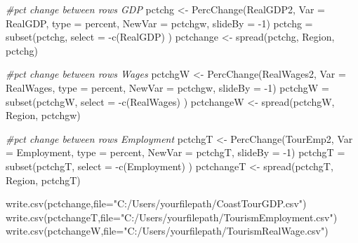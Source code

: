 \documentclass[
]{book}
\newenvironment{Shaded}{\begin{snugshade}}{\end{snugshade}}
\newcommand{\AttributeTok}[1]{\textcolor[rgb]{0.77,0.63,0.00}{#1}}
\newcommand{\CommentTok}[1]{\textcolor[rgb]{0.56,0.35,0.01}{\textit{#1}}}
\newcommand{\DecValTok}[1]{\textcolor[rgb]{0.00,0.00,0.81}{#1}}
\newcommand{\FunctionTok}[1]{\textcolor[rgb]{0.00,0.00,0.00}{#1}}
\newcommand{\NormalTok}[1]{#1}
\newcommand{\OtherTok}[1]{\textcolor[rgb]{0.56,0.35,0.01}{#1}}
\newcommand{\SpecialCharTok}[1]{\textcolor[rgb]{0.00,0.00,0.00}{#1}}
\newcommand{\StringTok}[1]{\textcolor[rgb]{0.31,0.60,0.02}{#1}}
\begin{document}
\begin{Shaded}
\begin{Highlighting}[]
\CommentTok{\#pct change between rows GDP}
\NormalTok{pctchg }\OtherTok{\textless{}{-}} \FunctionTok{PercChange}\NormalTok{(RealGDP2, }\AttributeTok{Var =} \StringTok{\textquotesingle{}RealGDP\textquotesingle{}}\NormalTok{,}
                     \AttributeTok{type =} \StringTok{\textquotesingle{}percent\textquotesingle{}}\NormalTok{,}
                     \AttributeTok{NewVar =} \StringTok{\textquotesingle{}pctchgw\textquotesingle{}}\NormalTok{,}
                     \AttributeTok{slideBy =} \SpecialCharTok{{-}}\DecValTok{1}\NormalTok{)}
\NormalTok{pctchg }\OtherTok{=} \FunctionTok{subset}\NormalTok{(pctchg, }\AttributeTok{select =} \SpecialCharTok{{-}}\FunctionTok{c}\NormalTok{(RealGDP) )}
\NormalTok{pctchange }\OtherTok{\textless{}{-}} \FunctionTok{spread}\NormalTok{(pctchg, Region, pctchg)}

\CommentTok{\#pct change between rows Wages}
\NormalTok{pctchgW }\OtherTok{\textless{}{-}} \FunctionTok{PercChange}\NormalTok{(RealWages2, }\AttributeTok{Var =} \StringTok{\textquotesingle{}RealWages\textquotesingle{}}\NormalTok{,}
                     \AttributeTok{type =} \StringTok{\textquotesingle{}percent\textquotesingle{}}\NormalTok{,}
                     \AttributeTok{NewVar =} \StringTok{\textquotesingle{}pctchgw\textquotesingle{}}\NormalTok{,}
                     \AttributeTok{slideBy =} \SpecialCharTok{{-}}\DecValTok{1}\NormalTok{)}
\NormalTok{pctchgW }\OtherTok{=} \FunctionTok{subset}\NormalTok{(pctchgW, }\AttributeTok{select =} \SpecialCharTok{{-}}\FunctionTok{c}\NormalTok{(RealWages) )}
\NormalTok{pctchangeW }\OtherTok{\textless{}{-}} \FunctionTok{spread}\NormalTok{(pctchgW, Region, pctchgw)}

\CommentTok{\#pct change between rows Employment}
\NormalTok{pctchgT }\OtherTok{\textless{}{-}} \FunctionTok{PercChange}\NormalTok{(TourEmp2, }\AttributeTok{Var =} \StringTok{\textquotesingle{}Employment\textquotesingle{}}\NormalTok{,}
                      \AttributeTok{type =} \StringTok{\textquotesingle{}percent\textquotesingle{}}\NormalTok{,}
                      \AttributeTok{NewVar =} \StringTok{\textquotesingle{}pctchgT\textquotesingle{}}\NormalTok{,}
                      \AttributeTok{slideBy =} \SpecialCharTok{{-}}\DecValTok{1}\NormalTok{)}
\NormalTok{pctchgT }\OtherTok{=} \FunctionTok{subset}\NormalTok{(pctchgT, }\AttributeTok{select =} \SpecialCharTok{{-}}\FunctionTok{c}\NormalTok{(Employment) )}
\NormalTok{pctchangeT }\OtherTok{\textless{}{-}} \FunctionTok{spread}\NormalTok{(pctchgT, Region, pctchgT)}

\FunctionTok{write.csv}\NormalTok{(pctchange,}\AttributeTok{file=}\StringTok{"C:/Users/yourfilepath/CoastTourGDP.csv"}\NormalTok{)}
\FunctionTok{write.csv}\NormalTok{(pctchangeT,}\AttributeTok{file=}\StringTok{"C:/Users/yourfilepath/TourismEmployment.csv"}\NormalTok{)}
\FunctionTok{write.csv}\NormalTok{(pctchangeW,}\AttributeTok{file=}\StringTok{"C:/Users/yourfilepath/TourismRealWage.csv"}\NormalTok{)}
\end{Highlighting}
\end{Shaded}
\end{document}
